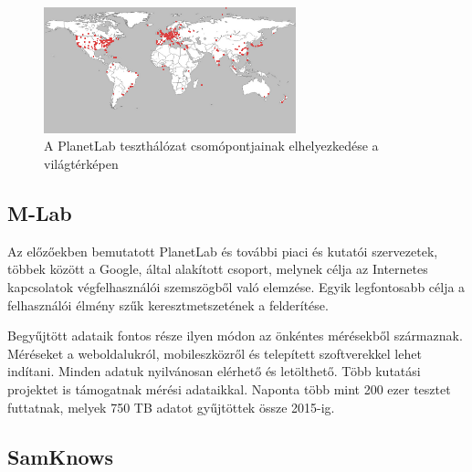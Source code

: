\begin{figure}[!ht]
	\centering
	\includegraphics[width=0.65\textwidth, keepaspectratio]{figures/planetlab_worldmap.png}
	\caption{A PlanetLab teszthálózat csomópontjainak elhelyezkedése a világtérképen\label{fig:planetlab}}
\end{figure}

\subsection{M-Lab}

Az előzőekben bemutatott PlanetLab és további piaci és kutatói szervezetek, többek között a Google, által alakított csoport, melynek célja az Internetes kapcsolatok végfelhasználói szemszögből való elemzése. Egyik legfontosabb célja a felhasználói élmény szűk keresztmetszetének a felderítése.

Begyűjtött adataik fontos része ilyen módon az önkéntes mérésekből származnak. Méréseket a weboldalukról, mobileszközről és telepített szoftverekkel lehet indítani. Minden adatuk nyilvánosan elérhető és letölthető. Több kutatási projektet is támogatnak mérési adataikkal. Naponta több mint 200 ezer tesztet futtatnak, melyek 750 TB adatot gyűjtöttek össze 2015-ig. 



\subsection{SamKnows}

